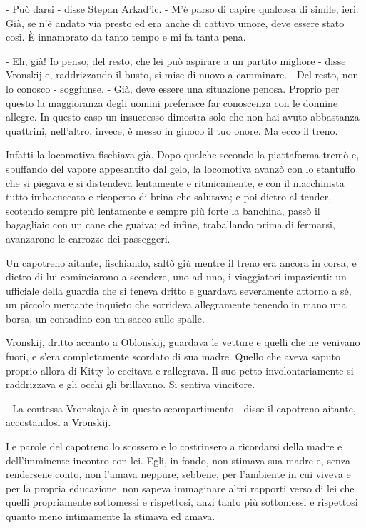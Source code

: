 - Può darsi - disse Stepan Arkad'ic. - M'è parso di capire qualcosa di simile, ieri. Già, se n'è andato via presto ed era anche di cattivo umore, deve essere stato così. È innamorato da tanto tempo e mi fa tanta pena. 

- Eh, già! Io penso, del resto, che lei può aspirare a un partito migliore - disse Vronskij e, raddrizzando il busto, si mise di nuovo a camminare. - Del resto, non lo conosco - soggiunse. - Già, deve essere una situazione penosa. Proprio per questo la maggioranza degli uomini preferisce far conoscenza con le donnine allegre. In questo caso un insuccesso dimostra solo che non hai avuto abbastanza quattrini, nell'altro, invece, è messo in giuoco il tuo onore. Ma ecco il treno. 

Infatti la locomotiva fischiava già. Dopo qualche secondo la piattaforma tremò e, sbuffando del vapore appesantito dal gelo, la locomotiva avanzò con lo stantuffo che si piegava e si distendeva lentamente e ritmicamente, e con il macchinista tutto imbacuccato e ricoperto di brina che salutava; e poi dietro al tender, scotendo sempre più lentamente e sempre più forte la banchina, passò il bagagliaio con un cane che guaiva; ed infine, traballando prima di fermarsi, avanzarono le carrozze dei passeggeri. 

Un capotreno aitante, fischiando, saltò giù mentre il treno era ancora in corsa, e dietro di lui cominciarono a scendere, uno ad uno, i viaggiatori impazienti: un ufficiale della guardia che si teneva dritto e guardava severamente attorno a sé, un piccolo mercante inquieto che sorrideva allegramente tenendo in mano una borsa, un contadino con un sacco sulle spalle. 

Vronskij, dritto accanto a Oblonskij, guardava le vetture e quelli che ne venivano fuori, e s'era completamente scordato di sua madre. Quello che aveva saputo proprio allora di Kitty lo eccitava e rallegrava. Il suo petto involontariamente si raddrizzava e gli occhi gli brillavano. Si sentiva vincitore. 

- La contessa Vronskaja è in questo scompartimento - disse il capotreno aitante, accostandosi a Vronskij. 

Le parole del capotreno lo scossero e lo costrinsero a ricordarsi della madre e dell'imminente incontro con lei. Egli, in fondo, non stimava sua madre e, senza rendersene conto, non l'amava neppure, sebbene, per l'ambiente in cui viveva e per la propria educazione, non sapeva immaginare altri rapporti verso di lei che quelli propriamente sottomessi e rispettosi, anzi tanto più sottomessi e rispettosi quanto meno intimamente la stimava ed amava. 

